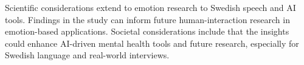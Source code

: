 Scientific considerations extend to emotion research to Swedish speech and AI tools. Findings in the study can inform future human-interaction research in emotion-based applications. Societal considerations include that the insights could enhance AI-driven mental health tools and future research, especially for Swedish language and real-world interviews. 